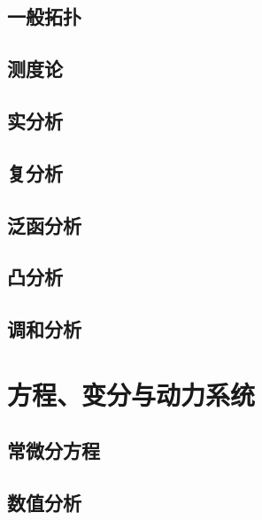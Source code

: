 \documentclass[zihao=false,linespread=1.5,heading=true,a4paper,oneside,fontset=windows]{ctexbook}
\begin{document}
\chapter{一般拓扑}\label{chap:general-topology}


\chapter{测度论}\label{chap:measure-theory}


\chapter{实分析}\label{chap:real-analysis}


\chapter{复分析}\label{chap:complex-analysis}


\chapter{泛函分析}\label{chap:functional-analysis}


\chapter{凸分析}\label{chap:convex-analysis}


\chapter{调和分析}\label{chap:harmonic-analysis}


\part{方程、变分与动力系统}\label{part:equations-variations}

\chapter{常微分方程}\label{chap:ordinary-differential-equations}


\chapter{数值分析}\label{chap:numerical-analysis}

\end{document}
